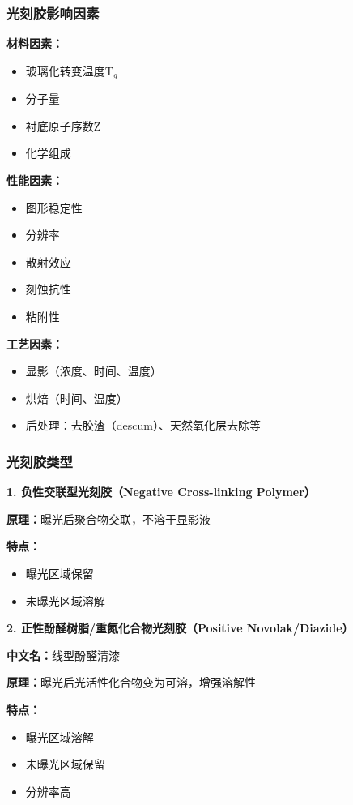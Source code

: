 \documentclass[UTF8,12pt,a4paper]{ctexart}
\begin{document}
\subsubsection{光刻胶影响因素}

\textbf{材料因素：}
\begin{itemize}
    \item 玻璃化转变温度T$_g$
    \item 分子量
    \item 衬底原子序数Z
    \item 化学组成
\end{itemize}

\textbf{性能因素：}
\begin{itemize}
    \item 图形稳定性
    \item 分辨率
    \item 散射效应
    \item 刻蚀抗性
    \item 粘附性
\end{itemize}

\textbf{工艺因素：}
\begin{itemize}
    \item 显影（浓度、时间、温度）
    \item 烘焙（时间、温度）
    \item 后处理：去胶渣（descum）、天然氧化层去除等
\end{itemize}

\subsubsection{光刻胶类型}

\textbf{1. 负性交联型光刻胶（Negative Cross-linking Polymer）}

\textbf{原理：}曝光后聚合物交联，不溶于显影液

\textbf{特点：}
\begin{itemize}
    \item 曝光区域保留
    \item 未曝光区域溶解
\end{itemize}

\textbf{2. 正性酚醛树脂/重氮化合物光刻胶（Positive Novolak/Diazide）}

\textbf{中文名：}线型酚醛清漆

\textbf{原理：}曝光后光活性化合物变为可溶，增强溶解性

\textbf{特点：}
\begin{itemize}
    \item 曝光区域溶解
    \item 未曝光区域保留
    \item 分辨率高
\end{itemize}
\end{document}
